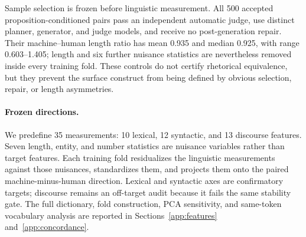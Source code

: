 Sample selection is frozen before linguistic measurement. All 500 accepted proposition-conditioned pairs pass an independent automatic judge, use distinct planner, generator, and judge models, and receive no post-generation repair. Their machine--human length ratio has mean 0.935 and median 0.925, with range 0.603--1.405; length and six further nuisance statistics are nevertheless removed inside every training fold. These controls do not certify rhetorical equivalence, but they prevent the surface construct from being defined by obvious selection, repair, or length asymmetries.

\paragraph{Frozen directions.} We predefine 35 measurements: 10 lexical, 12 syntactic, and 13 discourse features. Seven length, entity, and number statistics are nuisance variables rather than target features. Each training fold residualizes the linguistic measurements against those nuisances, standardizes them, and projects them onto the paired machine-minus-human direction. Lexical and syntactic axes are confirmatory targets; discourse remains an off-target audit because it fails the same stability gate. The full dictionary, fold construction, PCA sensitivity, and same-token vocabulary analysis are reported in Sections~\ref{app:features} and~\ref{app:concordance}.

